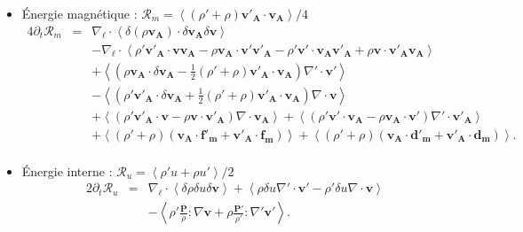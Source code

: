 \begin{itemize}
    \item Énergie magnétique : $\mathcal{R}_{m} = \left<\left(\rho'+\rho\right)\boldsymbol{v'_A} \cdot \boldsymbol{v_A}\right>/4 $
\begin{eqnarray}
\label{eq:turb_cpg_Rm} 4\partial_t \mathcal{R}_{m} &=& \nabla_{\boldsymbol{\ell}} \cdot \left<\delta \left(\rho\boldsymbol{v_A}\right) \cdot \delta \boldsymbol{v_A} \delta \boldsymbol{v} \right> \nonumber\\
&&-\nabla_{\boldsymbol{\ell}} \cdot \left< \rho' \boldsymbol{v'_A}\cdot  \boldsymbol{v} \boldsymbol{v_A} - \rho \boldsymbol{v_A}\cdot  \boldsymbol{v'} \boldsymbol{v'_A}-\rho' \boldsymbol{v'} \cdot\boldsymbol{v_A}\boldsymbol{v'_A} +  \rho  \boldsymbol{v} \cdot\boldsymbol{v'_A}\boldsymbol{v_A}\right> \nonumber\\
&&+ \left<\left(\rho \boldsymbol{v_A} \cdot \delta \boldsymbol{v_A} -\frac{1}{2} \left(\rho'+\rho\right) \boldsymbol{v'_A} \cdot \boldsymbol{v_A}\right)\nabla' \cdot \boldsymbol{v'}\right> \nonumber\\
&&-  \left<\left(\rho' \boldsymbol{v'_A} \cdot \delta \boldsymbol{v_A} + \frac{1}{2} \left(\rho'+\rho\right) \boldsymbol{v'_A} \cdot \boldsymbol{v_A}\right)\nabla \cdot \boldsymbol{v}\right>\nonumber\\
&& + \left<\left( \rho' \boldsymbol{v'_A} \cdot \boldsymbol{v} - \rho \boldsymbol{v} \cdot \boldsymbol{v'_A}  \right)\nabla \cdot \boldsymbol{v_A} \right> + \left<\left(\rho' \boldsymbol{v'} \cdot \boldsymbol{v_A} -  \rho \boldsymbol{v_A} \cdot \boldsymbol{v'} \right)\nabla' \cdot \boldsymbol{v'_A} \right>\nonumber\\
&&+  \left<\left(\rho' + \rho\right)\left(\boldsymbol{v_A} \cdot \boldsymbol{f'_m} + \boldsymbol{v'_A} \cdot \boldsymbol{f_m}\right) \right>+ \left<\left(\rho' + \rho\right)\left(\boldsymbol{v_A} \cdot \boldsymbol{d'_m} + \boldsymbol{v'_A} \cdot \boldsymbol{d_m}\right)\right> .\nonumber\\
\end{eqnarray}
    \item Énergie interne :  $\mathcal{R}_{u} = \left<\rho' u+\rho u'\right>/2 $
\begin{eqnarray}
\label{eq:turb_cpg_Ru} 2\partial_t \mathcal{R}_{u} &=&\nabla_{\boldsymbol{\ell}} \cdot \left<\delta \rho  \delta u \delta \boldsymbol{v} \right> + \left<  \rho \delta u \nabla' \cdot \boldsymbol{v'}- \rho' \delta u \nabla \cdot \boldsymbol{v}\right> \nonumber\\
&&-\left< \rho' \frac{\overline{\boldsymbol{P}}}{\rho} :  \nabla  \boldsymbol{v}  + \rho \frac{\overline{\boldsymbol{P'}}}{\rho'} : \nabla'  \boldsymbol{v'} \right> .
\end{eqnarray}
\end{itemize}
